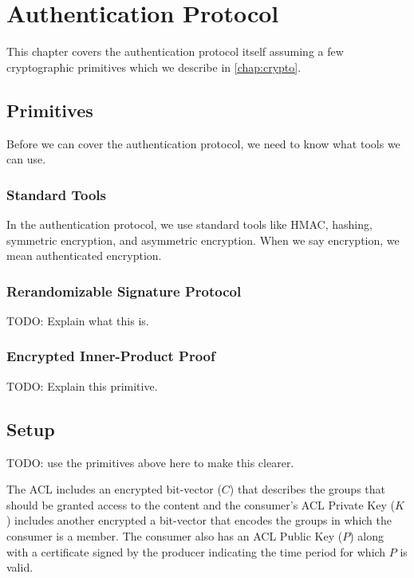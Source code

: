 \documentclass[pdftex,12pt,a4papaer,twoside,notitlepage]{report}
\begin{document}
\chapter{Authentication Protocol}

This chapter covers the authentication protocol itself assuming a few
cryptographic primitives which we describe in \cref{chap:crypto}.

\section{Primitives}

Before we can cover the authentication protocol, we need to know what tools we
can use.

\subsection{Standard Tools}

In the authentication protocol, we use standard tools like HMAC, hashing,
symmetric encryption, and asymmetric encryption. When we say encryption, we mean
authenticated encryption.

\subsection{Rerandomizable Signature Protocol}

TODO: Explain what this is.

\subsection{Encrypted Inner-Product Proof}

TODO: Explain this primitive.

\section{Setup}

TODO: use the primitives above here to make this clearer.

The ACL includes an encrypted bit-vector ($C$) that describes the groups
that should be granted access to the content and the consumer's ACL Private Key
($K$) includes another encrypted a bit-vector that encodes the groups in which
the consumer is a member. The consumer also has an ACL Public Key ($P$) along
with a certificate signed by the producer indicating the time period for which
$P$ is valid.
\end{document}
